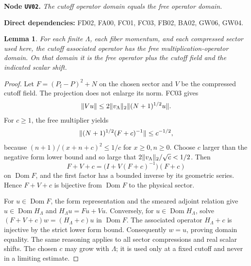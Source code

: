 \documentclass[11pt,a4paper]{article}
\newtheorem{lemma}[theorem]{Lemma}
\theoremstyle{remark}\newtheorem{remark}[theorem]{Remark}
\newcommand{\Pf}{P_{\mathrm f}}\newcommand{\Id}{I}\newcommand{\Dom}{\operatorname{Dom}}
\newcommand{\node}[3]{\par\Needspace{6\baselineskip}\smallskip\hypertarget{node:#1}{}\label{nodepage:#1}\noindent\textbf{Node \texttt{#1}.} \textit{#2.}\par\noindent\textbf{Direct dependencies:} #3.\par}
\begin{document}
\node{UV02}{The cutoff operator domain equals the free operator domain}{FD02, FA00, FC01, FC03, FB02, BA02, GW06, GW04}
\begin{lemma}\label{lem:cutoffdomain}
For each finite $\Lambda$, each fiber momentum, and each compressed sector used here, the cutoff associated operator has the free multiplication-operator domain. On that domain it is the free operator plus the cutoff field and the indicated scalar shift.
\end{lemma}
\begin{proof}
Let $F=(\Pf-P)^2+N$ on the chosen sector and $V$ be the compressed cutoff field. The projection does not enlarge its norm. FC03 gives
\[
 \lVert Vu\rVert\leq 2\lVert v_\Lambda\rVert_2\lVert (N+1)^{1/2}u\rVert.
\]
For $c\geq1$, the free multiplier yields
\[
 \lVert (N+1)^{1/2}(F+c)^{-1}\rVert\leq c^{-1/2},
\]
because $(n+1)/(x+n+c)^2\leq1/c$ for $x\geq0,n\geq0$. Choose $c$ larger than the negative form lower bound and so large that
$2\lVert v_\Lambda\rVert_2/\sqrt c<1/2$. Then
\[
 F+V+c=\bigl(I+V(F+c)^{-1}\bigr)(F+c)
\]
on $\Dom F$, and the first factor has a bounded inverse by its geometric series. Hence $F+V+c$ is bijective from $\Dom F$ to the physical sector.

For $u\in\Dom F$, the form representation and the smeared adjoint relation give $u\in\Dom H_\Lambda$ and $H_\Lambda u=Fu+Vu$. Conversely, for $u\in\Dom H_\Lambda$, solve
$(F+V+c)w=(H_\Lambda+c)u$ in $\Dom F$. The associated operator $H_\Lambda+c$ is injective by the strict lower form bound. Consequently $w=u$, proving domain equality. The same reasoning applies to all sector compressions and real scalar shifts. The chosen $c$ may grow with $\Lambda$; it is used only at a fixed cutoff and never in a limiting estimate.
\end{proof}
\end{document}
